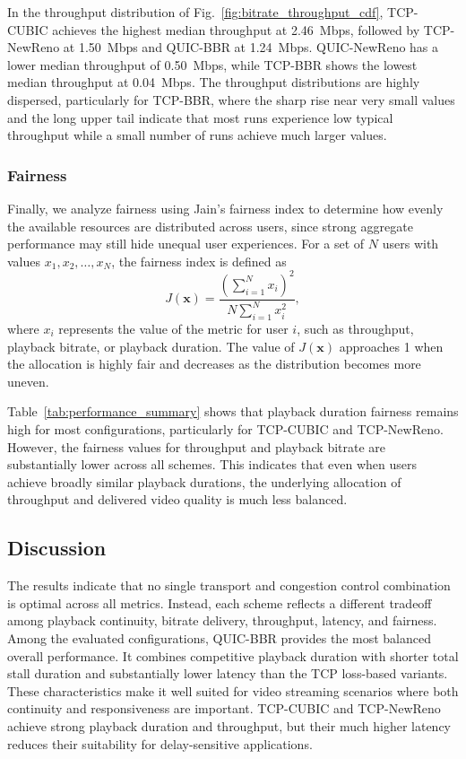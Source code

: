 \documentclass[journal]{IEEEtran}
\begin{document}
In the throughput distribution of Fig.~\ref{fig:bitrate_throughput_cdf}, TCP-CUBIC achieves the highest median throughput at 2.46~Mbps, followed by TCP-NewReno at 1.50~Mbps and QUIC-BBR at 1.24~Mbps. QUIC-NewReno has a lower median throughput of 0.50~Mbps, while TCP-BBR shows the lowest median throughput at 0.04~Mbps. The throughput distributions are highly dispersed, particularly for TCP-BBR, where the sharp rise near very small values and the long upper tail indicate that most runs experience low typical throughput while a small number of runs achieve much larger values.

\subsubsection{Fairness}
Finally, we analyze fairness using Jain's fairness index to determine how evenly the available resources are distributed across users, since strong aggregate performance may still hide unequal user experiences. For a set of $N$ users with values $x_1, x_2, \ldots, x_N$, the fairness index is defined as
\begin{equation}
J(\mathbf{x}) = \frac{\left(\sum_{i=1}^{N} x_i\right)^2}{N \sum_{i=1}^{N} x_i^2},
\label{eq:jain_fairness}
\end{equation}
where $x_i$ represents the value of the metric for user $i$, such as throughput, playback bitrate, or playback duration. The value of $J(\mathbf{x})$ approaches 1 when the allocation is highly fair and decreases as the distribution becomes more uneven.

Table~\ref{tab:performance_summary} shows that playback duration fairness remains high for most configurations, particularly for TCP-CUBIC and TCP-NewReno. However, the fairness values for throughput and playback bitrate are substantially lower across all schemes. This indicates that even when users achieve broadly similar playback durations, the underlying allocation of throughput and delivered video quality is much less balanced.

\subsection*{Discussion}
The results indicate that no single transport and congestion control combination is optimal across all metrics. Instead, each scheme reflects a different tradeoff among playback continuity, bitrate delivery, throughput, latency, and fairness. Among the evaluated configurations, QUIC-BBR provides the most balanced overall performance. It combines competitive playback duration with shorter total stall duration and substantially lower latency than the TCP loss-based variants. These characteristics make it well suited for video streaming scenarios where both continuity and responsiveness are important. TCP-CUBIC and TCP-NewReno achieve strong playback duration and throughput, but their much higher latency reduces their suitability for delay-sensitive applications.
\end{document}
